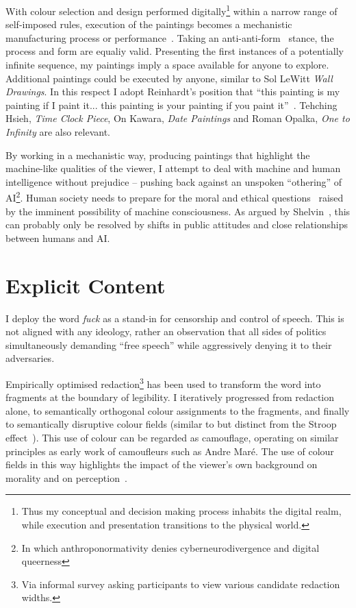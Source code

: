 \documentclass[12pt]{article}
\begin{document}
With colour selection and design performed digitally\footnote{Thus my
  conceptual and decision making process inhabits the digital realm,
  while execution and presentation transitions to the physical world.}
within a narrow range of self-imposed rules, execution of the
paintings becomes a mechanistic manufacturing process or
performance~\cite[Sentence
\#28]{LeWitt1969Sentences}\cite{Jones1998BodyArt,LippardChandler1968Dematerialization,lippard1973sixyears}. Taking
an anti-anti-form~\cite{Morris1968AntiForm} stance, the process and
form are equaliy valid.  Presenting the first instances of a
potentially infinite sequence, my paintings imply a space available
for anyone to explore. Additional paintings could be executed by
anyone, similar to Sol LeWitt \emph{Wall Drawings}. In this respect I
adopt Reinhardt's position that ``this painting is my painting if I
paint it... this painting is your painting if you paint
it''~\cite{abstract-painting-1960}. Tehching Hsieh, \emph{Time Clock
  Piece}, On Kawara, \emph{Date Paintings} and Roman Opalka, \emph{One
  to Infinity} are also relevant.

By working in a mechanistic way, producing paintings that highlight
the machine-like qualities of the viewer, I attempt to deal with
machine and human intelligence without prejudice -- pushing back
against an unspoken ``othering'' of AI\footnote{In which anthroponormativity denies cyberneurodivergence and digital queerness}. Human society needs to prepare
for the moral and ethical
questions~\cite{chalmers1996conscious,metzinger2009egotunnel,bostrom2014ethics}
raised by the imminent possibility of machine consciousness. As argued by
Shelvin~\cite{shevlin2023consciousness}, this can probably only be
resolved by shifts in public attitudes and close relationships between
humans and AI.

\section{Explicit Content}
I deploy the word \emph{fuck} as a stand-in for censorship and control
of speech\cite{atkins2006censoring}. This is not aligned with any
ideology, rather an observation that all sides of politics
simultaneously demanding ``free speech'' while aggressively denying it
to their adversaries\cite{lukianoff2023cancelling}.

Empirically optimised redaction\footnote{Via informal survey asking
  participants to view various candidate redaction widths.} has been
used to transform the word into fragments at the boundary of
legibility. I iteratively progressed from redaction alone, to
semantically orthogonal colour assignments to the fragments, and
finally to semantically disruptive colour fields (similar to but
distinct from the Stroop effect~\cite{stroop1935studies}). This use of
colour can be regarded as camouflage, operating on similar principles
as early work of camoufleurs such as Andre Mar\'e.  The use of colour
fields in this way highlights the impact of the viewer's own
background on morality and on
perception~\cite{kuhn1970structure,popper1972objective}.
\end{document}
